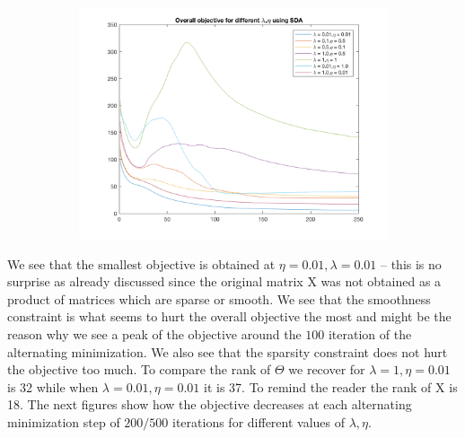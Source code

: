 \documentclass{article}
\newcommand{\0}{\mathrm{0}}
\newcommand{\1}{\mathrm{1}}
\newcommand{\X}{\mathrm{X}}
\begin{document}
\begin{center}
\begin{figure}[h]
  \begin{subfigure}[b]{0.3\textwidth}
    \includegraphics[scale=0.3]{SDA_overall}
  \end{subfigure}
\end{figure}
\end{center}
We see that the smallest objective is obtained at $\eta= 0.01,\lambda= 0.01$ -- this is no surprise as already discussed since the original matrix $\X$ was not obtained as a product of matrices which are sparse or smooth. We see that the smoothness constraint is what seems to hurt the overall objective the most and might be the reason why we see a peak of the objective around the $100$ iteration of the alternating minimization. We also see that the sparsity constraint does not hurt the objective too much. To compare the rank of $\Theta$ we recover for $\lambda = 1,\eta = 0.01$ is 32 while when $\lambda = 0.01,\eta = 0.01$ it is 37. To remind the reader the rank of $\X$ is 18. The next figures show how the objective decreases at each alternating minimization step of $200/500$ iterations for different values of $\lambda,\eta$.
\end{document}
